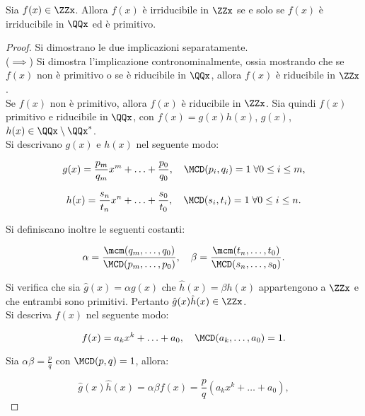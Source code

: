\begin{theorem}
    \label{th:lemma_gauss_2}
    Sia $f(x) \in \ZZx$. Allora $f(x)$ è irriducibile in $\ZZx$
    se e solo se $f(x)$ è irriducibile in $\QQx$ ed è primitivo.
\end{theorem}

\begin{proof} Si dimostrano le due implicazioni separatamente. \\

    ($\implies$)\; Si dimostra l'implicazione contronominalmente,
    ossia mostrando che se $f(x)$ non è primitivo o se è
    riducibile in $\QQx$, allora $f(x)$ è riducibile in $\ZZx$. \\

    Se $f(x)$ non è primitivo, allora
    $f(x)$ è riducibile in $\ZZx$. Sia quindi $f(x)$ primitivo
    e riducibile in $\QQx$, con $f(x)=g(x)h(x)$,
    $g(x)$, $h(x) \in \QQx \setminus \QQx^*$. \\

    Si descrivano $g(x)$ e $h(x)$ nel seguente modo:

    \[ g(x)=\frac{p_m}{q_m} x^m + \ldots + \frac{p_0}{q_0}, \quad \MCD(p_i, q_i)=1 \; \forall 0 \leq i \leq m, \]

    \[ h(x)=\frac{s_n}{t_n} x^n + \ldots + \frac{s_0}{t_0}, \quad
        \MCD(s_i, t_i)=1 \; \forall 0 \leq i \leq n. \]

    \vskip 0.1in

    Si definiscano inoltre le seguenti costanti:

    \[ \alpha = \frac{\mcm(q_m, \ldots, q_0)}{\MCD(p_m, \ldots, p_0)}, \quad \beta = \frac{\mcm(t_n, \ldots, t_0)}{\MCD(s_n, \ldots, s_0)}. \]

    \vskip 0.1in

    Si verifica che sia $\hat{g}(x)=\alpha g(x)$ che
    $\hat{h}(x)=\beta h(x)$ appartengono a $\ZZx$ e che entrambi
    sono primitivi. Pertanto $\hat{g}(x) \hat{h}(x) \in \ZZx$. \\

    Si descriva $f(x)$ nel seguente modo:

    \[ f(x)=a_k x^k + \ldots + a_0, \quad \MCD(a_k,\ldots,a_0)=1. \]

    \vskip 0.1in

    Sia $\alpha \beta = \frac{p}{q}$ con $\MCD(p,q)=1$, allora:

    \[\hat{g}(x) \hat{h}(x) = \alpha \beta f(x) = \frac{p}{q} (a_k x^k + \ldots + a_0), \]


\end{proof}
